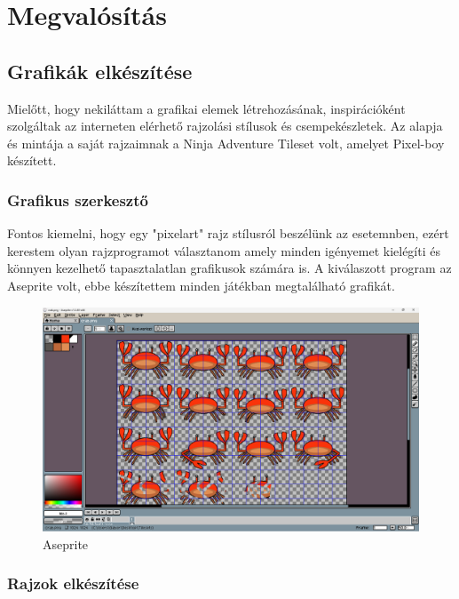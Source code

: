 \chapter{Megvalósítás}

\section{Grafikák elkészítése}

Mielőtt, hogy nekiláttam a grafikai elemek létrehozásának, inspirációként szolgáltak az interneten elérhető rajzolási stílusok és csempekészletek. Az alapja és mintája a saját rajzaimnak a Ninja Adventure Tileset volt, amelyet Pixel-boy készített.\cite{NAT}

\subsection{Grafikus szerkesztő}

Fontos kiemelni, hogy egy "pixelart" rajz stílusról beszélünk az esetemnben, ezért kerestem olyan rajzprogramot választanom amely minden igényemet kielégíti és könnyen kezelhető tapasztalatlan grafikusok számára is. A kiválaszott program az Aseprite volt, ebbe készítettem minden játékban megtalálható grafikát. \cite{Aseprite}

\begin{figure}[H]
    \centering
    \includegraphics[width=14.0truecm]{images/Aseprite.png}
    \caption{Aseprite}
    \label{fig:Aseprite}
\end{figure}


\subsection{Rajzok elkészítése}

